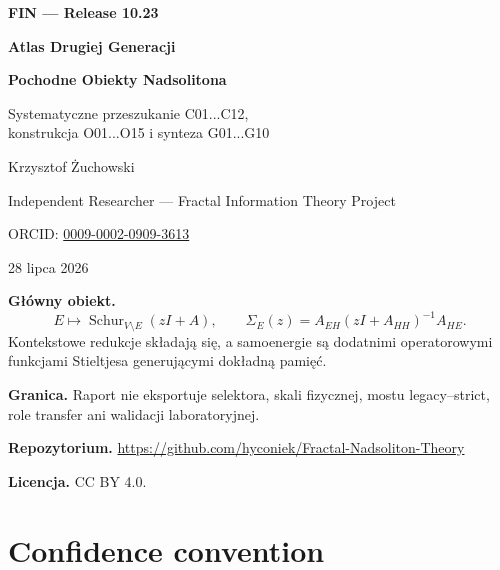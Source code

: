 \documentclass[11pt,a4paper,openany]{report}
\begin{document}
\hypersetup{pageanchor=false}
\begin{titlepage}
\centering
\vspace*{12mm}
{\Large\bfseries FIN --- Release 10.23\par}
\vspace{12mm}
{\Huge\bfseries Atlas Drugiej Generacji\par}
\vspace{5mm}
{\LARGE\bfseries Pochodne Obiekty Nadsolitona\par}
\vspace{8mm}
{\Large Systematyczne przeszukanie C01...C12,\\
konstrukcja O01...O15 i synteza G01...G10\par}
\vspace{18mm}
{\Large Krzysztof \.Zuchowski\par}
\vspace{2mm}
{\normalsize Independent Researcher --- Fractal Information Theory Project\par}
\vspace{2mm}
{\normalsize ORCID: \href{https://orcid.org/0009-0002-0909-3613}{0009-0002-0909-3613}\par}
\vspace{10mm}
{\large 28 lipca 2026\par}
\vfill
\begin{minipage}{0.9\textwidth}
\small
\textbf{Główny obiekt.}
\[
E\longmapsto \operatorname{Schur}_{V\setminus E}(zI+A),\qquad
\Sigma_E(z)=A_{EH}(zI+A_{HH})^{-1}A_{HE}.
\]
Kontekstowe redukcje składają się, a samoenergie są dodatnimi operatorowymi
funkcjami Stieltjesa generującymi dokładną pamięć.

\medskip
\textbf{Granica.} Raport nie eksportuje selektora, skali fizycznej,
mostu legacy--strict, role transfer ani walidacji laboratoryjnej.

\medskip
\textbf{Repozytorium.}
\url{https://github.com/hyconiek/Fractal-Nadsoliton-Theory}

\textbf{Licencja.} CC BY 4.0.
\end{minipage}
\vfill
\end{titlepage}
\hypersetup{pageanchor=true}
\tableofcontents
\clearpage
{}

\chapter*{Confidence convention}
\end{document}
